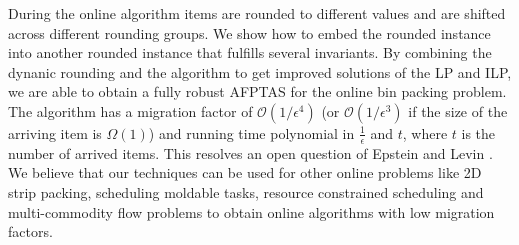 \documentclass[a4paper,11pt]{article}
\begin{document}
During the online algorithm items are rounded to different values and are shifted across different 
rounding groups. We show how to embed the rounded instance into another rounded instance that fulfills
several invariants.
By combining the dynanic rounding and the algorithm to get improved solutions of the LP and ILP, we are able
to obtain a fully robust AFPTAS for the online bin packing problem.
The algorithm has a migration factor of 
$\mathcal{O}(1/\epsilon^4)$ (or $\mathcal{O}(1/\epsilon^3)$ if the size of the arriving item is $\Omega(1)$) and 
running time polynomial in $\frac{1}{\epsilon}$ and $t$, where $t$ is the number of arrived items. 
This resolves an open question of Epstein and Levin \cite{epstein2006robust}. We believe that our techniques
can be used for other online problems like 2D strip packing, scheduling moldable tasks, resource constrained
scheduling and multi-commodity flow problems to obtain online algorithms with low migration factors.
\end{document}
